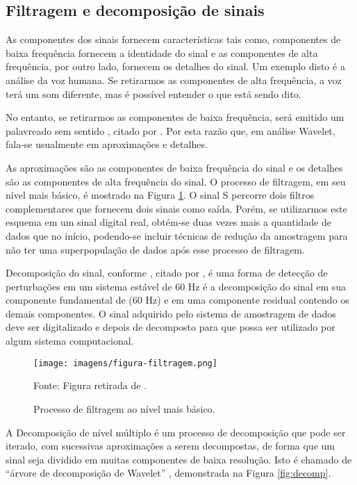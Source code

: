 \subsection{Filtragem e decomposição de sinais}
\par
As componentes dos sinais fornecem características tais como, componentes de baixa frequência fornecem a identidade do sinal e as componentes de alta frequência, por outro lado, fornecem os detalhes do sinal. Um exemplo disto é a análise da voz humana. Se retirarmos as componentes de alta frequência, a voz terá um som diferente, mas é possível entender o que está sendo dito.
\par
No entanto, se retirarmos as componentes de baixa frequência, será emitido um palavreado sem sentido \cite{MIS96}, citado por \cite{DEL03}. Por esta razão que, em análise Wavelet, fala-se usualmente em aproximações e detalhes.
\par
As aproximações são as componentes de baixa frequência do sinal e os detalhes são as componentes de alta frequência do sinal. O processo de filtragem, em seu nível mais básico, é mostrado na Figura \ref{fig:filtragem}. O sinal S percorre dois filtros complementares que fornecem dois sinais como saída. Porém, se utilizarmos este esquema em um sinal digital real, obtém-se duas vezes mais a quantidade de dados que no início, podendo-se incluir técnicas de redução da amostragem para não ter uma superpopulação de dados após esse processo de filtragem. 
\par 
Decomposição do sinal, conforme \cite{JUN09}, citado por \cite{BAC11}, é uma forma de detecção de perturbações em um sistema estável de 60 Hz é a decomposição do sinal em sua componente fundamental de (60 Hz) e em uma componente residual contendo os demais componentes. O sinal adquirido pelo sistema de amostragem de dados deve ser digitalizado e depois de decomposto para que possa ser utilizado por algum sistema computacional.
\begin{figure}[!h]
\begin{center}
\caption{Processo de filtragem ao nível mais básico.}
\texttt{[image: imagens/figura-filtragem.png]}
\par{\small Fonte: Figura retirada de \cite{MEN08}.}
\label{fig:filtragem}
\end{center}
\end{figure}
\par
A Decomposição de nível múltiplo é um processo de decomposição que pode ser iterado, com sucessivas aproximações a serem decompostas, de forma que um sinal seja dividido em muitas componentes de baixa resolução. Isto é chamado de “árvore de decomposição de Wavelet” \cite{MEN08}, demonstrada na Figura \ref{fig:decomp}.
